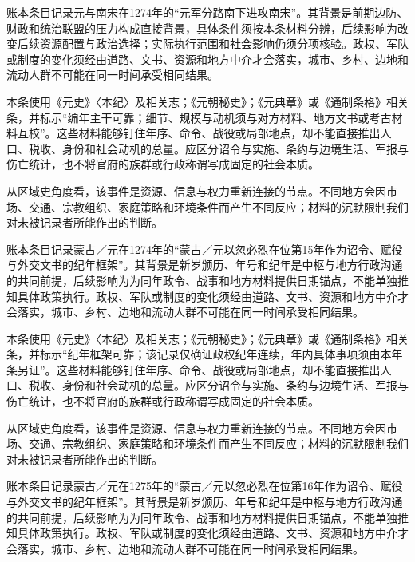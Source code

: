 账本条目记录元与南宋在1274年的“元军分路南下进攻南宋”。其背景是前期边防、财政和统治联盟的压力构成直接背景，具体条件须按本条材料分辨，后续影响为改变后续资源配置与政治选择；实际执行范围和社会影响仍须分项核验。政权、军队或制度的变化须经由道路、文书、资源和地方中介才会落实，城市、乡村、边地和流动人群不可能在同一时间承受相同结果。

本条使用《元史》〈本纪〉及相关志；《元朝秘史》；《元典章》或《通制条格》相关条，并标示“编年主干可靠；细节、规模与动机须与对方材料、地方文书或考古材料互校”。这些材料能够钉住年序、命令、战役或局部地点，却不能直接推出人口、税收、身份和社会动机的总量。应区分诏令与实施、条约与边境生活、军报与伤亡统计，也不将官府的族群或行政称谓写成固定的社会本质。

从区域史角度看，该事件是资源、信息与权力重新连接的节点。不同地方会因市场、交通、宗教组织、家庭策略和环境条件而产生不同反应；材料的沉默限制我们对未被记录者所能作出的判断。

账本条目记录蒙古／元在1274年的“蒙古／元以忽必烈在位第15年作为诏令、赋役与外交文书的纪年框架”。其背景是新岁颁历、年号和纪年是中枢与地方行政沟通的共同前提，后续影响为为同年政令、战事和地方材料提供日期锚点，不能单独推知具体政策执行。政权、军队或制度的变化须经由道路、文书、资源和地方中介才会落实，城市、乡村、边地和流动人群不可能在同一时间承受相同结果。

本条使用《元史》〈本纪〉及相关志；《元朝秘史》；《元典章》或《通制条格》相关条，并标示“纪年框架可靠；该记录仅确证政权纪年连续，年内具体事项须由本年条另证”。这些材料能够钉住年序、命令、战役或局部地点，却不能直接推出人口、税收、身份和社会动机的总量。应区分诏令与实施、条约与边境生活、军报与伤亡统计，也不将官府的族群或行政称谓写成固定的社会本质。

从区域史角度看，该事件是资源、信息与权力重新连接的节点。不同地方会因市场、交通、宗教组织、家庭策略和环境条件而产生不同反应；材料的沉默限制我们对未被记录者所能作出的判断。

账本条目记录蒙古／元在1275年的“蒙古／元以忽必烈在位第16年作为诏令、赋役与外交文书的纪年框架”。其背景是新岁颁历、年号和纪年是中枢与地方行政沟通的共同前提，后续影响为为同年政令、战事和地方材料提供日期锚点，不能单独推知具体政策执行。政权、军队或制度的变化须经由道路、文书、资源和地方中介才会落实，城市、乡村、边地和流动人群不可能在同一时间承受相同结果。


